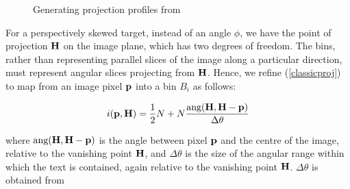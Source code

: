 \begin{figure}[t]
\centering
\begin{center}
\end{center}
\caption{Generating projection profiles from }
\label{projprofsfig}
\end{figure}




For a perspectively skewed target, instead of an angle $\phi$, we have the point of projection
${ \bf H }$ on the image plane, which has two degrees of freedom. The bins,
rather than representing parallel slices of the image along a particular
direction, must represent angular slices projecting from ${ \bf H }$.  Hence, we
refine (\ref{classicproj}) to map from an image pixel ${ \bf p }$ into a bin
$B_i$ as follows:


\begin{equation} \label{persproj} i( { \bf p,{ \bf H } } ) = \frac{1}{2} N + N \frac{ \mbox{ang}({ \bf H },{ \bf H }-{ \bf p }) }{ \Delta \theta } \end{equation}

{ \parindent 0mm 
where $\mbox{ang}({ \bf H },{ \bf H }-{ \bf p })$ is the angle
between pixel ${ \bf p }$ and the centre of the image, relative to the vanishing
point ${ \bf H }$, and $\Delta \theta$ is the size of the angular range within
which the text is contained, again relative to the vanishing point
${ \bf H }$. $ \Delta \theta$ is obtained from 
}


